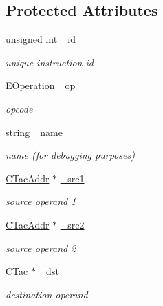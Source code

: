 \subsection*{Protected Attributes}
\begin{DoxyCompactItemize}
\item 
\hypertarget{classCTacInstr_af6b5f95263321e245814471b2eca6a41}{unsigned int \hyperlink{classCTacInstr_af6b5f95263321e245814471b2eca6a41}{\-\_\-id}}\label{classCTacInstr_af6b5f95263321e245814471b2eca6a41}

\begin{DoxyCompactList}\small\item\em unique instruction id \end{DoxyCompactList}\item 
\hypertarget{classCTacInstr_a62888e17d8a3abd6aea0a234c9176981}{E\-Operation \hyperlink{classCTacInstr_a62888e17d8a3abd6aea0a234c9176981}{\-\_\-op}}\label{classCTacInstr_a62888e17d8a3abd6aea0a234c9176981}

\begin{DoxyCompactList}\small\item\em opcode \end{DoxyCompactList}\item 
\hypertarget{classCTacInstr_a363584e5f433045963d1d208bddcaa52}{string \hyperlink{classCTacInstr_a363584e5f433045963d1d208bddcaa52}{\-\_\-name}}\label{classCTacInstr_a363584e5f433045963d1d208bddcaa52}

\begin{DoxyCompactList}\small\item\em name (for debugging purposes) \end{DoxyCompactList}\item 
\hypertarget{classCTacInstr_ad79c2ab37de1216de3dbac0dbda1e5ec}{\hyperlink{classCTacAddr}{C\-Tac\-Addr} $\ast$ \hyperlink{classCTacInstr_ad79c2ab37de1216de3dbac0dbda1e5ec}{\-\_\-src1}}\label{classCTacInstr_ad79c2ab37de1216de3dbac0dbda1e5ec}

\begin{DoxyCompactList}\small\item\em source operand 1 \end{DoxyCompactList}\item 
\hypertarget{classCTacInstr_a1435b2d46e3626a3837e78563dec85cf}{\hyperlink{classCTacAddr}{C\-Tac\-Addr} $\ast$ \hyperlink{classCTacInstr_a1435b2d46e3626a3837e78563dec85cf}{\-\_\-src2}}\label{classCTacInstr_a1435b2d46e3626a3837e78563dec85cf}

\begin{DoxyCompactList}\small\item\em source operand 2 \end{DoxyCompactList}\item 
\hypertarget{classCTacInstr_a7e4db0b0e327e8d7904550c87f3fa450}{\hyperlink{classCTac}{C\-Tac} $\ast$ \hyperlink{classCTacInstr_a7e4db0b0e327e8d7904550c87f3fa450}{\-\_\-dst}}\label{classCTacInstr_a7e4db0b0e327e8d7904550c87f3fa450}

\begin{DoxyCompactList}\small\item\em destination operand \end{DoxyCompactList}\end{DoxyCompactItemize}
